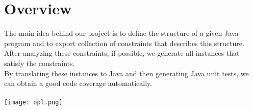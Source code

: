 \section{Overview}
\label{sec:Overview}
The main idea behind our project is to define the structure of a given Java program and to export collection of constraints that describes this structure. After analyzing these constraints, if possible, we generate all instances that satisfy the constraints.\\
By translating these instances to Java and then generating Java unit tests, we can obtain a good code coverage automatically.\\~\\
\texttt{[image: opl.png]}
